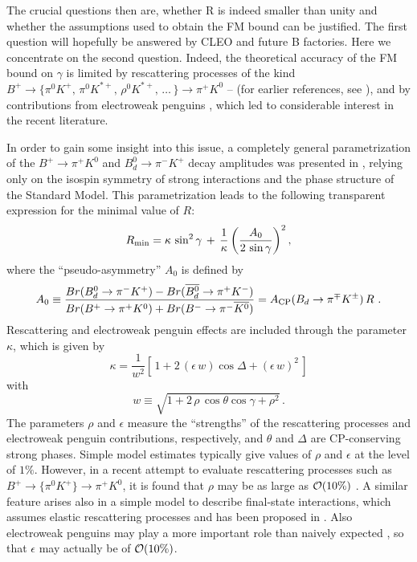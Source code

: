The crucial questions
then are, whether R is indeed smaller than unity  and whether
the assumptions used to obtain the FM bound can be justified.
The first question will hopefully be answered by CLEO and future
B factories. Here we concentrate on the second question.
Indeed,
the theoretical accuracy of the FM bound on $\gamma$ is limited by 
rescattering processes of the kind $B^+\to\{\pi^0K^+,\,\pi^0K^{\ast +},\,
\rho^0K^{\ast +},\,\ldots\,\}\to\pi^+K^0$ \cite{gewe}--\cite{atso} (for
earlier references, see \cite{FSI}), and by contributions from electroweak 
penguins \cite{groro,neubert,fm3}, which led to considerable interest in 
the recent literature. 

In order to gain some insight into this issue,
a completely general 
parametrization of the $B^+\to\pi^+K^0$ and $B^0_d\to\pi^-K^+$ decay 
amplitudes was presented in \cite{defan}, 
relying only on the isospin symmetry of strong 
interactions and the phase structure of the Standard Model. This 
parametrization leads to the following transparent expression for the 
minimal value of $R$:
\begin{equation}\label{Rmin}
R_{\rm min}=\kappa\,\sin^2\gamma\,+\,
\frac{1}{\kappa}\left(\frac{A_0}{2\,\sin\gamma}\right)^2,
\end{equation}
where the ``pseudo-asymmetry'' $A_0$ is defined by
\begin{equation}
A_0\equiv\frac{Br(B^0_d\to\pi^-K^+)-
Br(\overline{B^0_d}\to\pi^+K^-)}{Br(B^+\to\pi^+K^0)+
Br(B^-\to\pi^-\overline{K^0})}=
A_{\rm CP}(B_d\to\pi^\mp K^\pm)\,R~.
\end{equation}
Rescattering and electroweak penguin effects are included through the 
parameter $\kappa$, which is given by 
\begin{equation}
\kappa=\frac{1}{w^2}\left[\,1+2\,(\epsilon\,w)\cos\Delta+
(\epsilon\,w)^2\,\right]
\end{equation}
with
\begin{equation}\label{w-def}
w\equiv\sqrt{1+2\,\rho\,\cos\theta\cos\gamma+\rho^2}\,.
\end{equation}
The parameters $\rho$ and $\epsilon$ measure the ``strengths'' of the
rescattering processes and electroweak penguin contributions, respectively,
and $\theta$ and $\Delta$ are CP-conserving strong phases. Simple model 
estimates typically give values of $\rho$ and $\epsilon$ at the level of 
$1\%$. However, in a recent attempt to evaluate rescattering processes such 
as $B^+\to\{\pi^0K^+\}\to\pi^+K^0$, it is found that $\rho$ may be as large 
as ${\cal O}(10\%)$ \cite{fknp}. A similar feature arises also in a simple 
model to describe final-state interactions, which assumes elastic 
rescattering processes and has been proposed in \cite{gewe,neubert}. 
Also electroweak penguins may play a more important role than naively 
expected \cite{groro,neubert,fm3}, so that $\epsilon$ may actually be of 
${\cal O}(10\%)$. 

